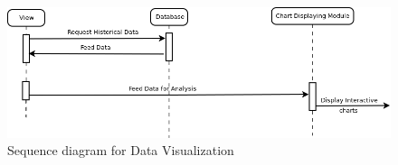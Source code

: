 \begin{figure}[H]\centering
  \includegraphics[width=6in]{fig/Charting}
  \caption{Sequence diagram for Data Visualization}
  \label{fig:Charting}
\end{figure}



